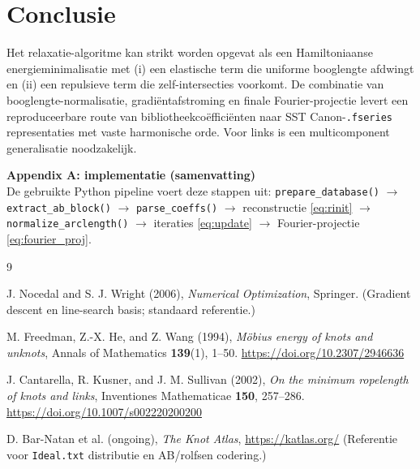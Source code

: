 \documentclass[11pt]{article}
\begin{document}
        \section{Conclusie}
        Het relaxatie-algoritme kan strikt worden opgevat als een Hamiltoniaanse energieminimalisatie met (i) een elastische term die uniforme booglengte afdwingt en (ii) een repulsieve term die zelf-intersecties voorkomt. De combinatie van booglengte-normalisatie, gradi\"entafstroming en finale Fourier-projectie levert een reproduceerbare route van bibliotheekco\"effici\"enten naar SST Canon-\texttt{.fseries} representaties met vaste harmonische orde. Voor links is een multicomponent generalisatie noodzakelijk.

        \bigskip
        \noindent\textbf{Appendix A: implementatie (samenvatting)}\\
        De gebruikte Python pipeline voert deze stappen uit: \texttt{prepare\_database()} $\to$ \texttt{extract\_ab\_block()} $\to$ \texttt{parse\_coeffs()} $\to$ reconstructie \eqref{eq:rinit} $\to$ \texttt{normalize\_arclength()} $\to$ iteraties \eqref{eq:update} $\to$ Fourier-projectie \eqref{eq:fourier_proj}.

        \begin{thebibliography}{9}

            J. Nocedal and S. J. Wright (2006),
            \textit{Numerical Optimization},
            Springer.
            (Gradient descent en line-search basis; standaard referentie.)

            M. Freedman, Z.-X. He, and Z. Wang (1994),
            \textit{M\"obius energy of knots and unknots},
            Annals of Mathematics \textbf{139}(1), 1--50.
            \url{https://doi.org/10.2307/2946636}

            J. Cantarella, R. Kusner, and J. M. Sullivan (2002),
            \textit{On the minimum ropelength of knots and links},
            Inventiones Mathematicae \textbf{150}, 257--286.
            \url{https://doi.org/10.1007/s002220200200}

            D. Bar-Natan et al. (ongoing),
            \textit{The Knot Atlas},
            \url{https://katlas.org/}
            (Referentie voor \texttt{Ideal.txt} distributie en AB/rolfsen codering.)

        \end{thebibliography}
\end{document}
